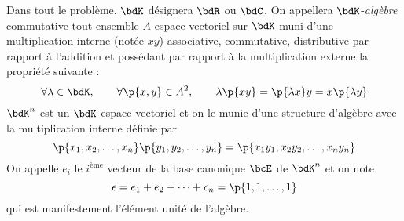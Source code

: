\documentclass[a4paper,french,bookmarks]{article}
\begin{document}
    \renewcommand{\thesection}{\Roman{section}}
    \renewcommand{\thesection}{Partie \Roman{section}}
    \renewcommand{\labelenumi}{\Roman{section}.\arabic{enumi}.}
    \renewcommand*{\labelenumii}{\alph{enumii}.}
    
    
    Dans tout le problème, $\bdK$ désignera $\bdR$ ou $\bdC$. On appellera $\bdK$-\textit{algèbre} commutative tout ensemble $A$ espace vectoriel sur $\bdK$ muni d'une multiplication interne (notée $xy$) associative, commutative, distributive par rapport à l'addition et possédant par rapport à la multiplication externe la propriété suivante :
    \[ \forall \lambda \in \bdK,\qquad \forall \p{x, y} \in A^2,\qquad \lambda\p{xy} = \p{\lambda x}y = x\p{\lambda y}\]
    $\bdK^n$ est un $\bdK$-espace vectoriel et on le munie d'une structure d'algèbre avec la multiplication interne définie par
    \[ \p{x_1, x_2, \dots, x_n}\p{y_1, y_2, \dots, y_n} = \p{x_1y_1, x_2y_2, \dots, x_ny_n} \]
    On appelle $e_i$ le $i^\text{ème}$ vecteur de la base canonique $\bcE$ de $\bdK^n$ et on note 
    \[ \epsilon = e_1 + e_2 + \dots + c_n = \p{1, 1, \dots, 1}\]
    qui est manifestement l'élément unité de l'algèbre.
    
    \section{}
    
\end{document}
